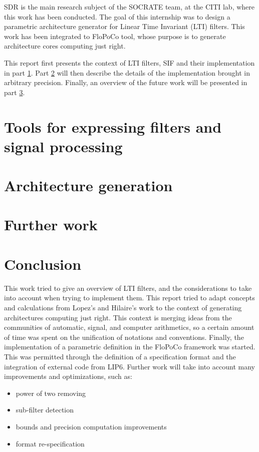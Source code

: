 \documentclass[twoside]{article}
\theoremstyle{remark}
\numberwithin{equation}{subsection}
\begin{document}
	
	SDR is the main research subject of the SOCRATE team, at the CITI lab, where this work has been conducted.
	The goal of this internship was to design a parametric architecture generator for Linear Time Invariant (LTI) filters.
	This work has been integrated to FloPoCo tool,
	whose purpose is to generate architecture cores computing just right.


	This report first presents the context of LTI filters, SIF and their implementation in part \ref{Part1}.
	Part \ref{Part2} will then describe the details of the implementation brought in arbitrary precision.
	Finally, an overview of the future work will be presented in part \ref{Part3}.

\section{Tools for expressing filters and signal processing}
\label{Part1}


\section{Architecture generation}
\label{Part2}


\section{Further work}
\label{Part3}


\section*{Conclusion}
	This work tried to give an overview of LTI filters, and the considerations to take into account when trying to implement them.
	This report tried to adapt concepts and calculations from Lopez's and Hilaire's work to the context of generating architectures computing just right.
	This context is merging ideas from the communities of automatic, signal, and computer arithmetics, so a certain amount of time was spent on the unification of notations and conventions.
	Finally, the implementation of a parametric definition in the FloPoCo framework was started.
	This was permitted through the definition of a specification format and the integration of external code from LIP6.
	Further work will take into account many improvements and optimizations, such as:
	\begin{itemize}
		\item power of two removing
		\item sub-filter detection
		\item bounds and precision computation improvements
		\item format re-specification
	\end{itemize}
\end{document}
